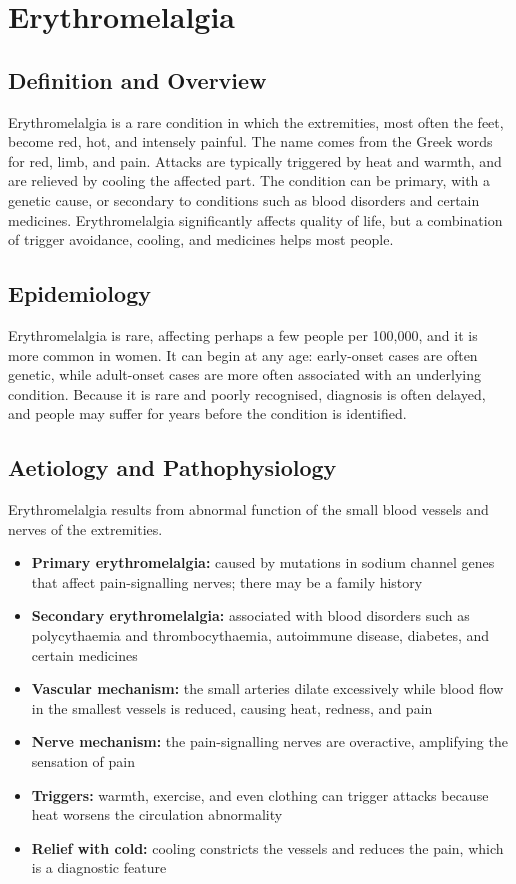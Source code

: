 \chapter{Erythromelalgia}

\section*{Definition and Overview}
Erythromelalgia is a rare condition in which the extremities, most often the feet, become red, hot, and intensely painful. The name comes from the Greek words for red, limb, and pain. Attacks are typically triggered by heat and warmth, and are relieved by cooling the affected part. The condition can be primary, with a genetic cause, or secondary to conditions such as blood disorders and certain medicines. Erythromelalgia significantly affects quality of life, but a combination of trigger avoidance, cooling, and medicines helps most people.

\section*{Epidemiology}
Erythromelalgia is rare, affecting perhaps a few people per 100,000, and it is more common in women. It can begin at any age: early-onset cases are often genetic, while adult-onset cases are more often associated with an underlying condition. Because it is rare and poorly recognised, diagnosis is often delayed, and people may suffer for years before the condition is identified.

\section*{Aetiology and Pathophysiology}
Erythromelalgia results from abnormal function of the small blood vessels and nerves of the extremities.
\begin{itemize}
    \item \textbf{Primary erythromelalgia:} caused by mutations in sodium channel genes that affect pain-signalling nerves; there may be a family history
    \item \textbf{Secondary erythromelalgia:} associated with blood disorders such as polycythaemia and thrombocythaemia, autoimmune disease, diabetes, and certain medicines
    \item \textbf{Vascular mechanism:} the small arteries dilate excessively while blood flow in the smallest vessels is reduced, causing heat, redness, and pain
    \item \textbf{Nerve mechanism:} the pain-signalling nerves are overactive, amplifying the sensation of pain
    \item \textbf{Triggers:} warmth, exercise, and even clothing can trigger attacks because heat worsens the circulation abnormality
    \item \textbf{Relief with cold:} cooling constricts the vessels and reduces the pain, which is a diagnostic feature
\end{itemize}

